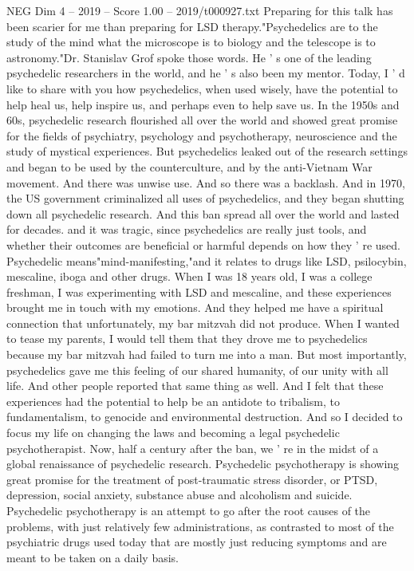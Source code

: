 \begin{textsample}{NEG Dim 4 – 2019 – Score 1.00 – 2019/t000927.txt}  \label{ex:f4_neg_035}
Preparing for this talk has been scarier for me than preparing for LSD therapy."Psychedelics are to the study of the mind what the microscope is to biology and the telescope is to astronomy."Dr.
Stanislav Grof spoke those words.
He ' s one of the leading psychedelic researchers in the world, and he ' s also been my mentor.
Today, I ' d like to share with you how psychedelics, when used wisely, have the potential to help heal us, help inspire us, and perhaps even to help save us.
In the 1950s and 60s, psychedelic research flourished all over the world and showed great promise for the fields of psychiatry, psychology and psychotherapy, neuroscience and the study of mystical experiences.
But psychedelics leaked out of the research settings and began to be used by the counterculture, and by the anti-Vietnam War movement.
And there was unwise use.
And so there was a backlash.
And in 1970, the US government criminalized all uses of psychedelics, and they began shutting down all psychedelic research.
And this ban spread all over the world and lasted for decades. and it was tragic, since psychedelics are really just tools, and whether their outcomes are beneficial or harmful depends on how they ' re used.
Psychedelic means"mind-manifesting,"and it relates to drugs like LSD, psilocybin, mescaline, iboga and other drugs.
When I was 18 years old, I was a college freshman, I was experimenting with LSD and mescaline, and these experiences brought me in touch with my emotions.
And they helped me have a spiritual connection that unfortunately, my bar mitzvah did not produce.
When I wanted to tease my parents, I would tell them that they drove me to psychedelics because my bar mitzvah had failed to turn me into a man.
But most importantly, psychedelics gave me this feeling of our shared humanity, of our unity with all life.
And other people reported that same thing as well.
And I felt that these experiences had the potential to help be an antidote to tribalism, to fundamentalism, to genocide and environmental destruction.
And so I decided to focus my life on changing the laws and becoming a legal psychedelic psychotherapist.
Now, half a century after the ban, we ' re in the midst of a global renaissance of psychedelic research.
Psychedelic psychotherapy is showing great promise for the treatment of post-traumatic stress disorder, or PTSD, depression, social anxiety, substance abuse and alcoholism and suicide.
Psychedelic psychotherapy is an attempt to go after the root causes of the problems, with just relatively few administrations, as contrasted to most of the psychiatric drugs used today that are mostly just reducing symptoms and are meant to be taken on a daily basis.

\end{textsample}
